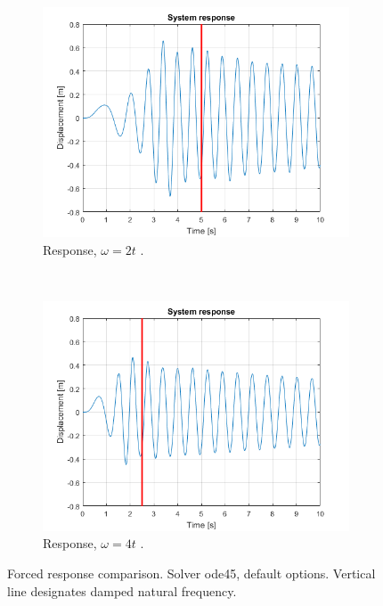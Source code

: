 \documentclass{article}
\begin{document}
	\begin{figure}[h]
		\centering
		\begin{subfigure}[t]{0.45\textwidth}
			\includegraphics[width=\textwidth]{forced_response_slow.png}
			\caption{Response, $\omega = 2 t$ .}
		\end{subfigure}
		~
		\begin{subfigure}[t]{0.45\textwidth}
			\includegraphics[width=\textwidth]{forced_response_fast.png}
			\caption{Response, $\omega = 4 t$ .}
		\end{subfigure}
		\caption{Forced response comparison. Solver ode45, default options. Vertical line designates damped natural frequency.}
		\label{fig:forced_response}
	\end{figure}
\end{document}
